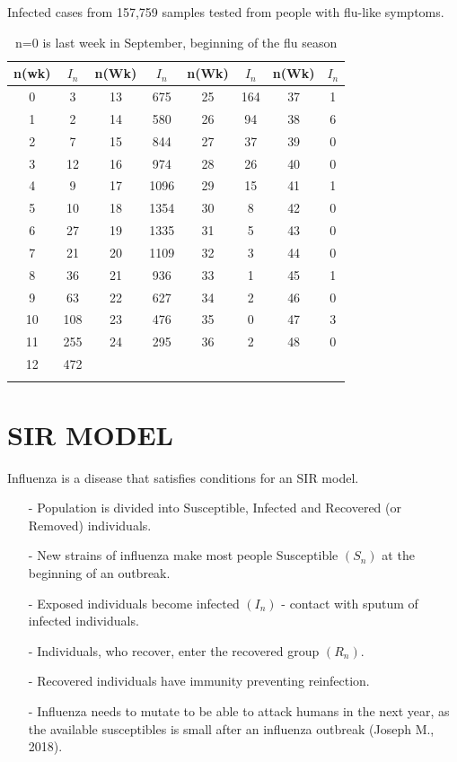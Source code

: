 \documentclass[12pt]{report}
\newcommand{\NI}{\noindent}
\begin{document}
	\NI Infected cases from 157,759 samples tested from people with flu-like symptoms. 
	\begin{longtable}{|@{\hskip 0.2in}c@{\hskip 0.2in}|@{\hskip 0.2in}c@{\hskip 0.2in}|@{\hskip 0.2in}c@{\hskip 0.2in}|@{\hskip 0.2in}c@{\hskip 0.2in}|@{\hskip 0.2in}c@{\hskip 0.2in}|@{\hskip 0.2in}c@{\hskip 0.2in}|@{\hskip 0.2in}c@{\hskip 0.2in}|c@{\hskip 0.2in}|}
		\hline
		n(wk) & $I_n$ & n(Wk) & $I_n$ & n(Wk) & $I_n$ & n(Wk) & $I_n$ \\ \hline
		0 & 3 & 13 & 675 & 25 & 164 & 37 & 1 \\ \hline 
		1 & 2 & 14 & 580 & 26 & 94 & 38 & 6 \\ \hline
		2 & 7 & 15 & 844 & 27 & 37 & 39 & 0 \\ \hline
		3 & 12 & 16 & 974 & 28 & 26 & 40 & 0 \\ \hline
		4 & 9 & 17 & 1096 & 29 & 15 & 41 & 1 \\ \hline
		5 & 10 & 18 & 1354 & 30 & 8 & 42 & 0 \\ \hline
		6 & 27 & 19 & 1335 & 31 & 5 & 43 & 0 \\ \hline
		7 & 21 & 20 & 1109 & 32 & 3 & 44 & 0 \\ \hline
		8 & 36 & 21 & 936 & 33 & 1 & 45 & 1 \\ \hline
		9 & 63 & 22 & 627 & 34 & 2 & 46 & 0 \\ \hline
		10 & 108 & 23 & 476 & 35 & 0 & 47 & 3 \\ \hline
		11 & 255 & 24 & 295 & 36 & 2 & 48 & 0 \\ \hline
		12 & 472 & & & & & & \\ \hline
		\caption{n=0 is last week in September, beginning of the flu season}
		\label{tb:4_1}	
	\end{longtable}
	\section{SIR MODEL}
	Influenza is a disease that satisfies conditions for an SIR model.
	\begin{itemize}
		\item[-] Population is divided into Susceptible, Infected and Recovered (or Removed) individuals.
		
		\item[-] New strains of influenza make most people Susceptible $(S_n)$ at the beginning of an outbreak.
		
		\item[-] Exposed individuals become infected $(I_n)$ - contact with sputum of infected individuals.
		
		\item[-] Individuals, who recover, enter the recovered group $(R_n)$.
		
		\item[-] Recovered individuals have immunity preventing reinfection.
		
		\item[-] Influenza needs to mutate to be able to attack humans in the next year, as the available susceptibles is small after an influenza outbreak (Joseph M., 2018).
	\end{itemize}
	
\end{document}
